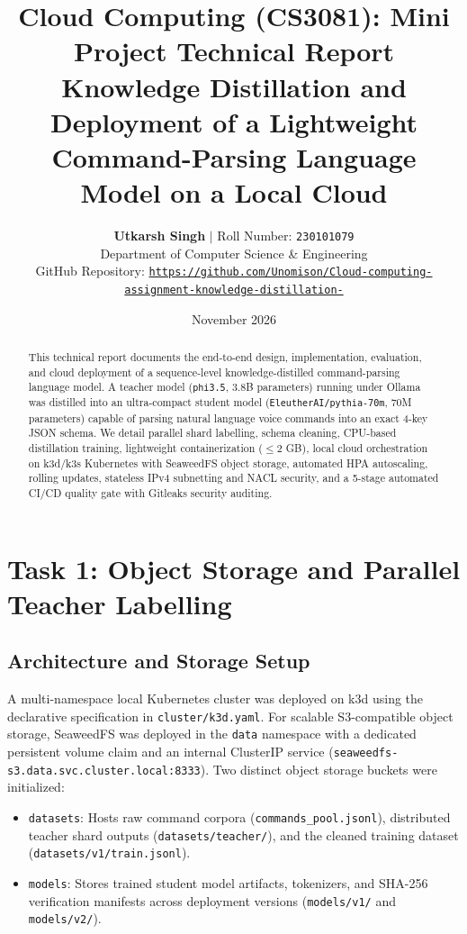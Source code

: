 \documentclass[10pt,a4paper]{article}
\title{\vspace{-1.5cm}\textbf{\Large Cloud Computing (CS3081): Mini Project Technical Report}\\
\large Knowledge Distillation and Deployment of a Lightweight Command-Parsing Language Model on a Local Cloud}
\author{\textbf{Utkarsh Singh} \quad$|$ \quad Roll Number: \texttt{230101079} \\
Department of Computer Science \& Engineering \\[3pt]
\footnotesize GitHub Repository: \href{https://github.com/Unomison/Cloud-computing-assignment-knowledge-distillation-}{\texttt{https://github.com/Unomison/Cloud-computing-assignment-knowledge-distillation-}}}
\date{\vspace{0.1cm}\small November 2026}
\begin{document}
\maketitle

\begin{abstract}
\noindent This technical report documents the end-to-end design, implementation, evaluation, and cloud deployment of a sequence-level knowledge-distilled command-parsing language model. A teacher model (\texttt{phi3.5}, 3.8B parameters) running under Ollama was distilled into an ultra-compact student model (\texttt{EleutherAI/pythia-70m}, 70M parameters) capable of parsing natural language voice commands into an exact 4-key JSON schema. We detail parallel shard labelling, schema cleaning, CPU-based distillation training, lightweight containerization ($\le 2$ GB), local cloud orchestration on k3d/k3s Kubernetes with SeaweedFS object storage, automated HPA autoscaling, rolling updates, stateless IPv4 subnetting and NACL security, and a 5-stage automated CI/CD quality gate with Gitleaks security auditing.
\end{abstract}

\vspace{-0.3cm}
\section{Task 1: Object Storage and Parallel Teacher Labelling}

\subsection{Architecture and Storage Setup}
A multi-namespace local Kubernetes cluster was deployed on k3d using the declarative specification in \texttt{cluster/k3d.yaml}. For scalable S3-compatible object storage, SeaweedFS was deployed in the \texttt{data} namespace with a dedicated persistent volume claim and an internal ClusterIP service (\texttt{seaweedfs-s3.\allowbreak data.\allowbreak svc.\allowbreak cluster.\allowbreak local:8333}). Two distinct object storage buckets were initialized:
\begin{itemize}\setlength\itemsep{0em}
    \item \texttt{datasets}: Hosts raw command corpora (\texttt{commands\_pool.jsonl}), distributed teacher shard outputs (\texttt{datasets/teacher/}), and the cleaned training dataset (\texttt{datasets/v1/train.jsonl}).
    \item \texttt{models}: Stores trained student model artifacts, tokenizers, and SHA-256 verification manifests across deployment versions (\texttt{models/v1/} and \texttt{models/v2/}).
\end{itemize}
\end{document}
